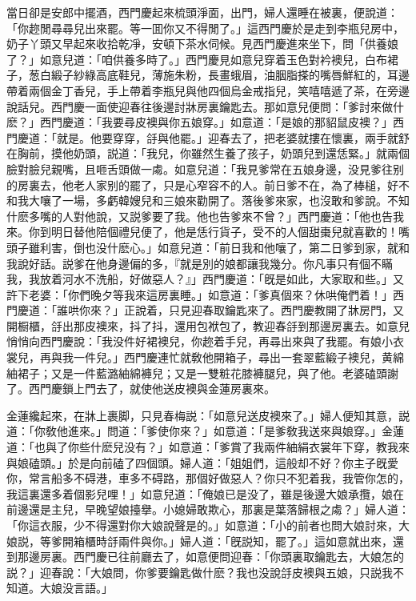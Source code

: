 當日卻是安郎中擺酒，西門慶起來梳頭淨面，出門，婦人還睡在被裏，便說道：「你趂閒尋尋兒出來罷。等一囬你又不得閒了。」這西門慶於是走到李瓶兒房中，奶子丫頭又早起來收拾乾凈，安頓下茶水伺候。見西門慶進來坐下，問「供養娘了？」如意兒道：「咱供養多時了。」西門慶見如意兒穿着玉色對衿襖兒，白布裙子，葱白緞子紗綠高底鞋兒，薄施朱粉，長畫蛾眉，油胭脂搽的嘴唇鮮紅的，耳邊帶着兩個金丁香兒，手上帶着李瓶兒與他四個烏金戒指兒，笑嘻嘻遞了茶，在旁邊說話兒。西門慶一面使迎春往後邊討牀房裏鑰匙去。那如意兒便問：「爹討來做什麽？」西門慶道：「我要尋皮襖與你五娘穿。」如意道：「是娘的那貂鼠皮襖？」西門慶道：「就是。他要穿穿，㧱與他罷。」迎春去了，把老婆就摟在懷裏，兩手就舒在胸前，摸他奶頭，説道：「我兒，你雖然生養了孩子，奶頭兒到還恁緊。」就兩個臉對臉兒親嘴，且咂舌頭做一䖏。如意兒道：「我見爹常在五娘身邊，没見爹往别的房裏去，他老人家别的罷了，只是心窄容不的人。前日爹不在，為了棒槌，好不和我大嚷了一場，多虧韓嫂兒和三娘來勸開了。落後爹來家，也沒敢和爹說。不知什麽多嘴的人對他說，又説爹要了我。他也告爹來不曾？」西門慶道：「他也告我來。你到明日替他陪個禮兒便了，他是恁行貨子，受不的人個甜棗兒就喜歡的！嘴頭子雖利害，倒也没什麽心。」如意兒道：「前日我和他嚷了，第二日爹到家，就和我說好話。説爹在他身邊偏的多，『就是別的娘都讓我幾分。你凡事只有個不瞞我，我放着河水不洗船，好做惡人？』」西門慶道：「旣是如此，大家取和些。」又許下老婆：「你們晚夕等我來這房裏睡。」如意道：「爹真個來？休哄俺們着！」西門慶道：「誰哄你來？」正說着，只見迎春取鑰匙來了。西門慶教開了牀房門，又開橱櫃，㧱出那皮襖來，抖了抖，還用包袱包了，教迎春㧱到那邊房裏去。如意兒悄悄向西門慶說：「我没件好裙襖兒，你趂着手兒，再尋出來與了我罷。有娘小衣裳兒，再與我一件兒。」西門慶連忙就敎他開箱子，尋出一套翠藍緞子襖兒，黄綿紬裙子；又是一件藍潞紬綿褲兒；又是一雙粧花膝褲腿兒，與了他。老婆磕頭謝了。西門慶鎖上門去了，就使他送皮襖與金蓮房裏來。

金蓮纔起來，在牀上裹脚，只見春梅説：「如意兒送皮襖來了。」婦人便知其意，説道：「你敎他進來。」問道：「爹使你來？」如意道：「是爹敎我送來與娘穿。」金蓮道：「也與了你些什麽兒没有？」如意道：「爹賞了我兩件紬絹衣裳年下穿，教我來與娘磕頭。」於是向前磕了四個頭。婦人道：「姐姐們，這般却不好？你主子旣愛你，常言船多不碍港，車多不碍路，那個好做惡人？你只不犯着我，我管你怎的，我這裏還多着個影兒哩！」如意兒道：「俺娘已是没了，雖是後邊大娘承攬，娘在前邊還是主兒，早晚望娘擡擧。小媳婦敢欺心，那裏是葉落歸根之䖏？」婦人道：「你這衣服，少不得還對你大娘說聲是的。」如意道：「小的前者也問大娘討來，大娘説，等爹開箱櫃時㧱兩件與你。」婦人道：「旣説知，罷了。」這如意就出來，還到那邊房裏。西門慶已往前廳去了，如意便問迎春：「你頭裏取鑰匙去，大娘怎的説？」迎春說：「大娘問，你爹要鑰匙做什麽？我也没說㧱皮襖與五娘，只説我不知道。大娘没言語。」

